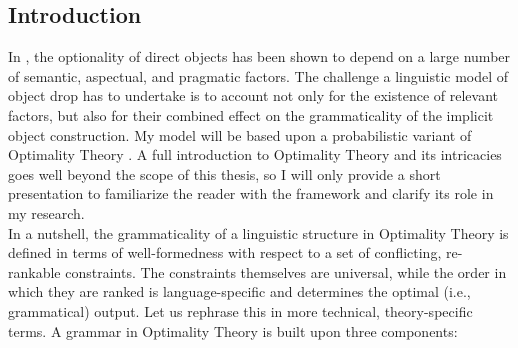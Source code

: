 \subsection{Introduction} In , the optionality of direct objects has been shown to depend on a large number of semantic, aspectual, and pragmatic factors. The challenge a linguistic model of object drop has to undertake is to account not only for the existence of relevant factors, but also for their combined effect on the grammaticality of the implicit object construction. My model will be based upon a probabilistic variant of Optimality Theory \parencite{princesmolensky1993optimality, PrinceSmolensky2008, PrinceSmolensky1997otIntro}. A full introduction to Optimality Theory and its intricacies goes well beyond the scope of this thesis, so I will only provide a short presentation to familiarize the reader with the framework and clarify its role in my research.\\ %
In a nutshell, the grammaticality of a linguistic structure in Optimality Theory is defined in terms of well-formedness with respect to a set of conflicting, re-rankable constraints. The constraints themselves are universal, while the order in which they are ranked is language-specific and determines the optimal (i.e., grammatical) output. Let us rephrase this in more technical, theory-specific terms. A grammar in Optimality Theory is built upon three components:
